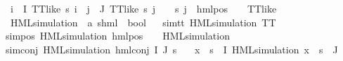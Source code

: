 \begin{isabellebody}
\ {\isachardoublequoteopen}{\isacharparenleft}{\kern0pt}{\isasymforall}i\ {\isasymin}\ I{\isachardot}{\kern0pt}\ TT{\isacharunderscore}{\kern0pt}like\ {\isacharparenleft}{\kern0pt}{\isasympsi}s\ i{\isacharparenright}{\kern0pt}{\isacharparenright}{\kern0pt}\ {\isasymand}\ {\isacharparenleft}{\kern0pt}{\isasymforall}j\ {\isasymin}\ J{\isachardot}{\kern0pt}\ {\isacharparenleft}{\kern0pt}TT{\isacharunderscore}{\kern0pt}like\ {\isacharparenleft}{\kern0pt}{\isasympsi}s\ j{\isacharparenright}{\kern0pt}{\isacharparenright}{\kern0pt}\ {\isasymor}\ {\isacharparenleft}{\kern0pt}{\isasymexists}{\isasymalpha}\ {\isasymchi}{\isachardot}{\kern0pt}\ {\isacharparenleft}{\kern0pt}{\isacharparenleft}{\kern0pt}{\isasympsi}s\ j{\isacharparenright}{\kern0pt}\ {\isacharequal}{\kern0pt}\ hml{\isacharunderscore}{\kern0pt}pos\ {\isasymalpha}\ {\isasymchi}\ {\isasymand}\ {\isacharparenleft}{\kern0pt}TT{\isacharunderscore}{\kern0pt}like\ {\isasymchi}{\isacharparenright}{\kern0pt}{\isacharparenright}{\kern0pt}{\isacharparenright}{\kern0pt}{\isacharparenright}{\kern0pt}{\isachardoublequoteclose}\ \isanewline
\isanewline
{}\isamarkupfalse%
\ HML{\isacharunderscore}{\kern0pt}simulation\ {\isacharcolon}{\kern0pt}{\isacharcolon}{\kern0pt}\ {\isachardoublequoteopen}{\isacharparenleft}{\kern0pt}{\isacharprime}{\kern0pt}a{\isacharcomma}{\kern0pt}\ {\isacharprime}{\kern0pt}s{\isacharparenright}{\kern0pt}hml\ {\isasymRightarrow}\ bool{\isachardoublequoteclose}\isanewline
\ \ \isanewline
sim{\isacharunderscore}{\kern0pt}tt{\isacharcolon}{\kern0pt}\ {\isachardoublequoteopen}HML{\isacharunderscore}{\kern0pt}simulation\ TT{\isachardoublequoteclose}\ {\isacharbar}{\kern0pt}\isanewline
sim{\isacharunderscore}{\kern0pt}pos{\isacharcolon}{\kern0pt}\ {\isachardoublequoteopen}HML{\isacharunderscore}{\kern0pt}simulation\ {\isacharparenleft}{\kern0pt}hml{\isacharunderscore}{\kern0pt}pos\ {\isasymalpha}\ {\isasymphi}{\isacharparenright}{\kern0pt}{\isachardoublequoteclose}\ \ {\isachardoublequoteopen}HML{\isacharunderscore}{\kern0pt}simulation\ {\isasymphi}{\isachardoublequoteclose}{\isacharbar}{\kern0pt}\isanewline
sim{\isacharunderscore}{\kern0pt}conj{\isacharcolon}{\kern0pt}\ {\isachardoublequoteopen}HML{\isacharunderscore}{\kern0pt}simulation\ {\isacharparenleft}{\kern0pt}hml{\isacharunderscore}{\kern0pt}conj\ I\ J\ {\isasympsi}s{\isacharparenright}{\kern0pt}\ {\isachardoublequoteclose}\ \isanewline
{}\ {\isachardoublequoteopen}{\isacharparenleft}{\kern0pt}{\isasymforall}x\ {\isasymin}\ {\isacharparenleft}{\kern0pt}{\isasympsi}s\ {\isacharbackquote}{\kern0pt}\ I{\isacharparenright}{\kern0pt}{\isachardot}{\kern0pt}\ HML{\isacharunderscore}{\kern0pt}simulation\ x{\isacharparenright}{\kern0pt}\ {\isasymand}\ {\isacharparenleft}{\kern0pt}{\isasympsi}s\ {\isacharbackquote}{\kern0pt}\ J\ {\isacharequal}{\kern0pt}\ {\isacharbraceleft}{\kern0pt}{\isacharbraceright}{\kern0pt}{\isacharparenright}{\kern0pt}{\isachardoublequoteclose}\isanewline

\end{isabellebody}
